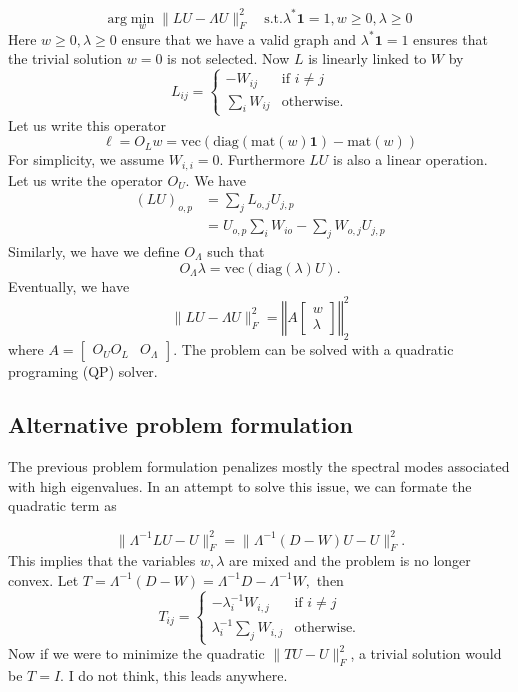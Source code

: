 \[
\text{arg}\min_{w}\|LU-\Lambda U\|_{F}^{2}\hspace{1em}\text{s.t.}\lambda^{*}\mathbf{1}=1,w\geq0,\lambda\ge0
\]
Here $w\geq0,\lambda\geq0$ ensure that we have a valid graph and
$\lambda^{*}\mathbf{1}=1$ ensures that the trivial solution $w=0$
is not selected. Now $L$ is linearly linked to $W$ by
\[
L_{ij}=\begin{cases}
-W_{ij} & \text{if }i\ne j\\
\sum_{i}W_{ij} & \text{otherwise.}
\end{cases}
\]
Let us write this operator 
\[
\ell=O_{L}w=\text{vec}\left(\text{diag}(\text{mat}(w)\mathbf{1})-\text{mat}(w)\right)
\]
For simplicity, we assume $W_{i,i}=0$. Furthermore $LU$ is also
a linear operation. Let us write the operator $O_{U}.$ We have 
\begin{align*}
\left(LU\right)_{o,p} & =\sum_{j}L_{o,j}U_{j,p}\\
& =U_{o,p}\sum_{i}W_{io}-\sum_{j}W_{o,j}U_{j,p}
\end{align*}
Similarly, we have we define $O_{\Lambda}$ such that 
\[
O_{\Lambda}\lambda=\text{vec}(\text{diag}(\lambda)U).
\]
Eventually, we have 
\[
\|LU-\Lambda U\|_{F}^{2}=\left\Vert A\left[\begin{array}{c}
w\\
\lambda
\end{array}\right]\right\Vert _{2}^{2}
\]
where $A=\left[\begin{array}{cc}
O_{U}O_{L} & O_{\Lambda}\end{array}\right]$. The problem can be solved with a quadratic programing (QP) solver.

\subsection*{Alternative problem formulation}

The previous problem formulation penalizes mostly the spectral modes associated with high eigenvalues. In an attempt to solve this issue, we can formate the quadratic term as

\[
\|\Lambda^{-1}LU-U\|_{F}^{2}=\|\Lambda^{-1}(D-W)U-U\|_{F}^{2}.
\]
This implies that the variables $w,\lambda$ are mixed and the problem
is no longer convex. Let $T=\Lambda^{-1}(D-W)=\Lambda^{-1}D-\Lambda^{-1}W,$
then 
\[
T_{ij}=\begin{cases}
-\lambda_{i}^{-1}W_{i,j} & \text{if }i\ne j\\
\lambda_{i}^{-1}\sum_{j}W_{i,j} & \text{otherwise.}
\end{cases}
\]
Now if we were to minimize the quadratic $\|TU-U\|_{F}^{2}$, a trivial
solution would be $T=I.$ I do not think, this leads anywhere. 

